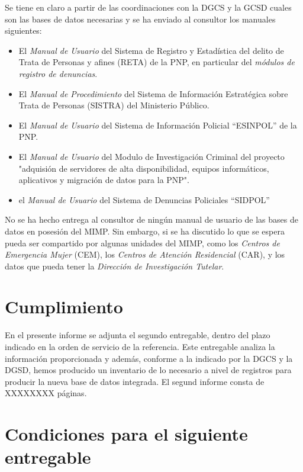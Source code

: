 \documentclass[a4paper,12pt]{texMemo}
\begin{document}
Se tiene en claro a partir de las coordinaciones con la DGCS y la GCSD cuales son las bases de datos necesarias y se ha enviado al consultor los manuales siguientes:
\begin{itemize}
\item El \emph{Manual de Usuario} del Sistema de Registro y Estadística del delito de Trata de Personas y afines (RETA) de la PNP, en particular del \emph{módulos de registro de denuncias}.
\item El \emph{Manual de Procedimiento} del Sistema de Información Estratégica sobre Trata de Personas (SISTRA) del 
Ministerio Público.
\item El \emph{Manual de Usuario} del  Sistema de Información Policial “ESINPOL” de la PNP.
\item El \emph{Manual de Usuario} del Modulo de Investigación Criminal del proyecto "adquisión de servidores de alta disponibilidad, equipos informáticos, aplicativos y migración de datos para la PNP".
\item el \emph{Manual de Usuario} del Sistema de Denuncias Policiales “SIDPOL”
\end{itemize}

No se ha hecho entrega al consultor de ningún manual de usuario de las bases de datos en posesión del MIMP. Sin embargo, si se ha discutido lo que se espera pueda ser compartido por algunas unidades del MIMP, como los \emph{Centros de Emergencia Mujer} (CEM), los \emph{Centros de Atención Residencial} (CAR), y los datos que pueda tener la \emph{Dirección de Investigación Tutelar}.

\section{Cumplimiento}

En el presente informe se adjunta el segundo entregable, dentro del plazo indicado en la orden de servicio de la referencia. Este entregable analiza la información proporcionada y además, conforme a la indicado por la DGCS y la DGSD, hemos producido un inventario de lo necesario a nivel de registros para producir la nueva base de datos integrada. El segund informe consta de XXXXXXXX páginas. 

\section{Condiciones para el siguiente entregable}
\end{document}
